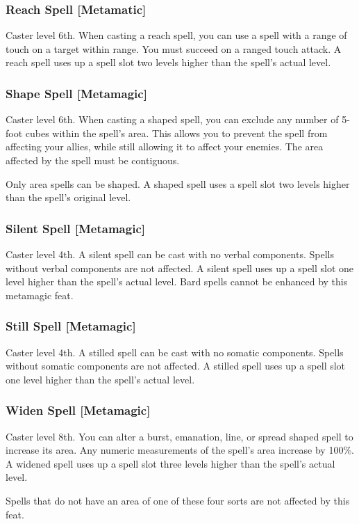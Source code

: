 \subsubsection{Reach Spell [Metamatic]}
 Caster level 6th.
 When casting a reach spell, you can use a spell with a range of touch on a target within \rngclose range. You must succeed on a ranged touch attack. A reach spell uses up a spell slot two levels higher than the spell's actual level.

\subsubsection{Shape Spell [Metamagic]}
 Caster level 6th.
 When casting a shaped spell, you can exclude any number of 5-foot cubes within the spell's area. This allows you to prevent the spell from affecting your allies, while still allowing it to affect your enemies. The area affected by the spell must be contiguous.

Only area spells can be shaped. A shaped spell uses a spell slot two levels higher than the spell's original level.

\subsubsection{Silent Spell [Metamagic]}
 Caster level 4th.
 A silent spell can be cast with no verbal components. Spells without verbal components are not affected. A silent spell uses up a spell slot one level higher than the spell's actual level.
 Bard spells cannot be enhanced by this metamagic feat.

\subsubsection{Still Spell [Metamagic]}
 Caster level 4th.
 A stilled spell can be cast with no somatic components. Spells without somatic components are not affected. A stilled spell uses up a spell slot one level higher than the spell's actual level.

\subsubsection{Widen Spell [Metamagic]}
 Caster level 8th.
 You can alter a burst, emanation, line, or spread shaped spell to increase its area. Any numeric measurements of the spell's area increase by 100\%. A widened spell uses up a spell slot three levels higher than the spell's actual level.
\par Spells that do not have an area of one of these four sorts are not affected by this feat.

